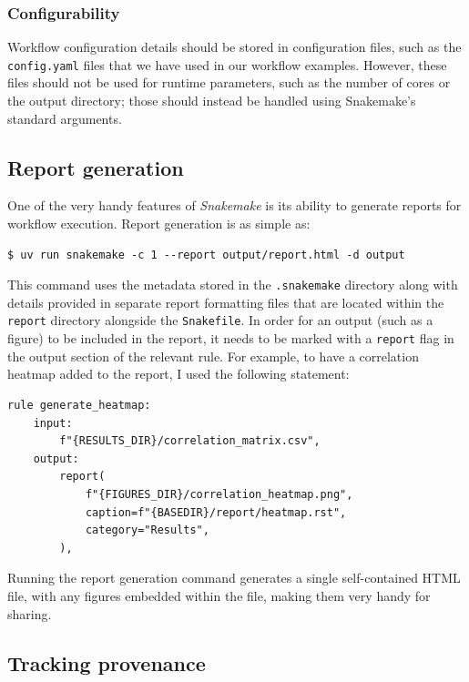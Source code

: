 \subsubsection{Configurability}

Workflow configuration details should be stored in configuration files, such as the \texttt{config.yaml} files that we have used in our workflow examples.  However, these files should not be used for runtime parameters, such as the number of cores or the output directory; those should instead be handled using Snakemake's standard arguments.

\subsection{Report generation}

One of the very handy features of \textit{Snakemake} is its ability to generate reports for workflow execution.  Report generation is as simple as:

\begin{lstlisting}[style=shell, numbers=none]
$ uv run snakemake -c 1 --report output/report.html -d output
\end{lstlisting}

This command uses the metadata stored in the \texttt{.snakemake} directory along with details provided in separate report formatting files that are located within the \texttt{report} directory alongside the \texttt{Snakefile}. In order for an output (such as a figure) to be included in the report, it needs to be marked with a \texttt{report} flag in the output section of the relevant rule.  For example, to have a correlation heatmap added to the report, I used the following statement:

\begin{lstlisting}[style=Python]
rule generate_heatmap:
    input:
        f"{RESULTS_DIR}/correlation_matrix.csv",
    output:
        report(
            f"{FIGURES_DIR}/correlation_heatmap.png",
            caption=f"{BASEDIR}/report/heatmap.rst",
            category="Results",
        ),
\end{lstlisting}

Running the report generation command generates a single self-contained HTML file, with any figures embedded within the file, making them very handy for sharing.

\subsection{Tracking provenance}

